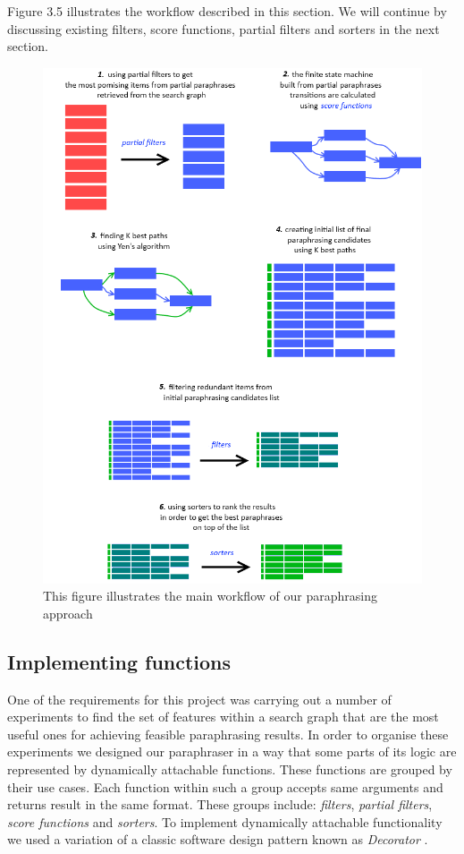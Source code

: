 Figure 3.5 illustrates the workflow described in this section. We will continue by discussing existing filters, score functions, partial filters and sorters in the next section.

\begin{figure}
 \centering 
 \includegraphics[scale=0.82]{g/main-workflow.png}
 \caption{This figure illustrates the main workflow of our paraphrasing approach}
\end{figure}

\subsection{Implementing functions}

One of the requirements for this project was carrying out a number of experiments to find the set of features within a search graph that are the most useful ones for achieving feasible paraphrasing results. In order to organise these experiments we designed our paraphraser in a way that some parts of its logic are represented by dynamically attachable functions. These functions are grouped by their use cases. Each function within such a group accepts same arguments and returns result in the same format. These groups include: \emph{filters}, \emph{partial filters}, \emph{score functions} and \emph{sorters}. To implement dynamically attachable functionality we used a variation of a classic software design pattern known as \emph{Decorator} \citep{vlissides1995design}.

